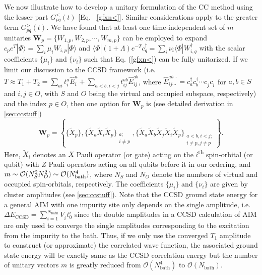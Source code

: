 \documentclass[aip,reprint,table,xcdraw,usenames,dvipsnames]{revtex4-1}
\begin{document}
We now illustrate how to develop a unitary formulation of the CC method using the lesser  part $G^{<}_{pq}(t)$ [Eq. ~\eqref{gfxn<}]. Similar considerations apply to the greater term $G^{>}_{pq}(t)$. We have found that at least one time-independent set of $m$ unitaries $\mathbf{W}_p = \{ W_{1,p}, W_{2,p}, \cdots, W_{m,p} \}$ can be employed to expand 
$c_p e^{T} | \Phi \rangle = \sum_i \mu_i W_{i,p} | \Phi \rangle$ and
$\langle \Phi |(1+\Lambda) e^{-T} c_q^\dagger = \sum_i \nu_i \langle \Phi | W_{i,q}^\dagger$ 
with the scalar coefficients $\{\mu_i\}$ and $\{\nu_i\}$ such that Eq. (\ref{gfxn<}) can be fully unitarized. If we limit our discussion to the CCSD framework (i.e. $T \approx T_1+T_2 = \sum_{ai}t_i^a \hat{E}^a_i + \sum_{a<b,i<j} t_{ij}^{ab} \hat{E}^{ab}_{ij}$, where $\hat{E}^{ab\cdots}_{ij\cdots} = c_a^\dagger c_b^\dagger \cdots c^{\phantom\dagger}_j c^{\phantom\dagger}_i$ for $a,b\in S$ and $i,j\in O$, with $S$ and $O$ being 
the virtual and occupied subspace, respectively) and the index $p\in O$, then one option for $\textbf{W}_p$ is (see detailed derivation in \ref{sec:ccstuff})
%
\begin{equation*}
\mathbf{W}_p =\left\{ 
\{\tilde{X}_p\}, 
\{ \tilde{X}_a \tilde{X}_i \tilde{X}_p\}_{\substack{a; \\ i\neq p}},
\{\tilde{X}_a \tilde{X}_b \tilde{X}_j \tilde{X}_i \tilde{X}_p\}
_{\substack{a<b,i<j; \\ i\neq p, j\neq p}} 
\right\}. 
\end{equation*}
%
Here, $\tilde{X}_i$ denotes an $X$ Pauli operator (or gate) acting on the $i$\textsuperscript{th} spin-orbital (or qubit) with $Z$ Pauli operators acting on all qubits before it in our ordering, and $m \sim \mathcal{O}(N_S^2N_O^2) \sim \mathcal{O}(N_{\rm bath}^4)$, where $N_S$ and $N_O$ denote the numbers of virtual and occupied spin-orbitals, respectively.
%
The coefficients $\{\mu_i\}$ and $\{\nu_i\}$ are given by cluster amplitudes (see \ref{sec:ccstuff}). Note that the CCSD ground state energy for a general AIM with one impurity site only depends on the single amplitude, i.e. $\Delta E_{\text{CCSD}}=\sum_{i=1}^{N_{\text{bath}}}V^{\phantom\dagger}_i t_0^i$ since the double amplitudes in a CCSD calculation of AIM are only used to converge the single amplitudes corresponding to the excitation from the impurity to the bath. Thus, if we only use the converged $T_1$ amplitude to construct (or approximate) the correlated wave function, the associated ground state energy will be exactly same as the CCSD correlation energy but the number of unitary vectors $m$ is greatly reduced from $\mathcal{O}(N_{\text{bath}}^4)$ to $\mathcal{O}(N_{\text{bath}})$. 
\end{document}
